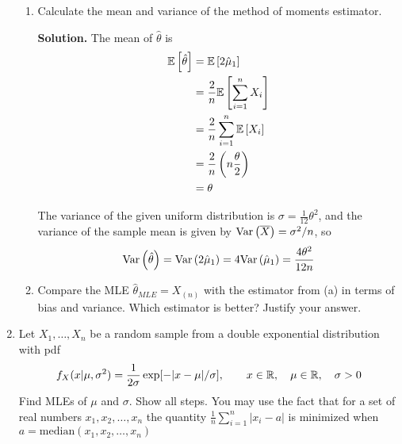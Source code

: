 \documentclass[titlepage]{article}
\begin{document}
\begin{enumerate}
\begin{enumerate}
  \item Calculate the mean and variance of the method of moments estimator.

  \textbf{Solution.} The mean of $\hat{\theta}$ is
  \[\begin{aligned}
  \mathbb{E}\left[ \hat{\theta} \right] &= \mathbb{E}\left[ 2\hat{\mu}_1 \right] \\
                    &= \frac{2}{n} \mathbb{E}\left[ \sum_{i=1}^n X_i \right] \\
                    &= \frac{2}{n} \sum_{i=1}^n \mathbb{E}\left[ X_i \right] \\
                    &= \frac{2}{n}\left(n\frac{\theta}{2}\right)\\
                    &= \theta
  \end{aligned}\]

  The variance of the given uniform distribution is $\sigma = \frac{1}{12}\theta^2$, and the variance of the sample mean is given by $\text{Var}\left( \overline{X} \right) = \sigma^2 / n$, so
  \[\text{Var}\left( \hat{\theta} \right) = \text{Var}\left( 2\hat{\mu}_1 \right) = 4 \text{Var}\left( \hat{\mu}_1 \right) = \frac{4\theta^2}{12n}\]

  \item Compare the MLE $\hat{\theta}_{MLE} = X_{(n)}$ with the estimator from (a) in terms of bias and variance. Which estimator is better? Justify your answer.
  \end{enumerate}

\item Let $X_1, \ldots, X_n$ be a random sample from a double exponential distribution with pdf
  \[f_X(x | \mu, \sigma^2) = \frac{1}{2\sigma}\exp[-|x-\mu|/\sigma], \qquad x \in \mathbb{R}, \quad \mu \in \mathbb{R}, \quad \sigma > 0\]
Find MLEs of $\mu$ and $\sigma$. Show all steps. You may use the fact that for a set of real numbers $x_1, x_2, \ldots, x_n$ the quantity $\frac{1}{n}\sum_{i=1}^n |x_i - a|$ is minimized when $a = \text{median}(x_1, x_2, \ldots, x_n)$


\end{enumerate}
\end{document}
